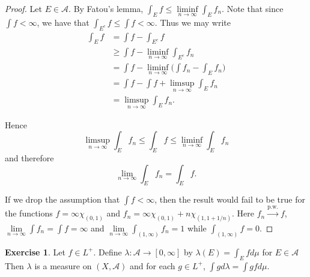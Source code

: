 \documentclass{book}
\theoremstyle{definition}
\newtheorem{ex}[definition]{Exercise}
\newcommand{\lam}{\lambda}
\newcommand{\MA}{\mathcal{A}}
\newcommand{\lex}[1]{\label{ex:#1}}
\DeclareMathOperator*{\0}{\mbf{0}}
\DeclareMathOperator*{\1}{\mbf{1}}
\newcommand{\limfn}{\liminf \limits_{n \rightarrow \infty}}
\newcommand{\limpn}{\limsup \limits_{n \rightarrow \infty}}
\newcommand{\limn}{\lim \limits_{n \rightarrow \infty}}
\newcommand{\RG}{[0,\infty]}
\begin{document}
	\begin{proof}
		
		Let $E \in \MA$. By Fatou's lemma, $\int_E f \leq \limfn \int_E f_n$. Note that since $\int f < \infty$, we have that $\int_{E^c} f \leq \int f < \infty$. Thus we may write
		\begin{align*}
			\int_E f 
			&= \int f - \int_{E^c} f\\
			&\geq \int f - \limfn \int_{E^c} f_n\\
			&= \int f - \limfn \bigg(\int f_n - \int_{E} f_n\bigg)\\
			&= \int f - \int f  + \limpn \int_{E} f_n\\
			&= \limpn \int_E f_n.
		\end{align*}
		
		Hence $$\limpn \int_E f_n \leq \int_E f \leq \limfn \int_E f_n$$ and therefore $$\limn \int_E f_n = \int_E f.$$ 
		
		If we drop the assumption that $\int f < \infty$, then the result would fail to be true for the functions $f = \infty \chi_{(0,1)}$ and $ f_n = \infty \chi_{(0,1)} + n \chi_{(1,1+1/n)}$. Here $f_n \xrightarrow{\text{p.w.}} f$, $\limn \int f_n = \int f = \infty$ and $\limn \int_{(1,\infty)} f_n = 1$ while $\int_{(1,\infty)} f = 0$.  
		
	\end{proof}
	
	\begin{ex} \lex{00000} 
		Let $f \in L^+$. Define $\lam: \MA \rightarrow \RG$ by $\lam(E) = \int_E f d\mu$ for $E \in \MA$
		Then $\lam$ is a measure on $(X, \MA)$ and for each $g \in L^+$, $\int g d\lam = \int g f d\mu$.
	\end{ex}
	
\end{document}
